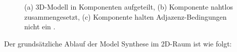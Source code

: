\documentclass[12pt, a4paper,twoside,openright]{report} %
\begin{document}
\begin{figure}[H]
    \centering
    \qquad
    \qquad
    \caption{(a) 3D-Modell in Komponenten aufgeteilt, (b) Komponente nahtlos zusammengesetzt, (c) Komponente halten Adjazenz-Bedingungen nicht ein \cite{merrell2009model}.}%
\end{figure}

Der grundsätzliche Ablauf der Model Synthese im 2D-Raum ist wie folgt:
\end{document}
